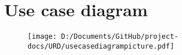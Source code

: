 \chapter{Use case diagram}

\begin{figure}[h!]
\begin{center}
\texttt{[image: D:/Documents/GitHub/project-docs/URD/usecasediagrampicture.pdf]}
\end{center}
\end{figure}
